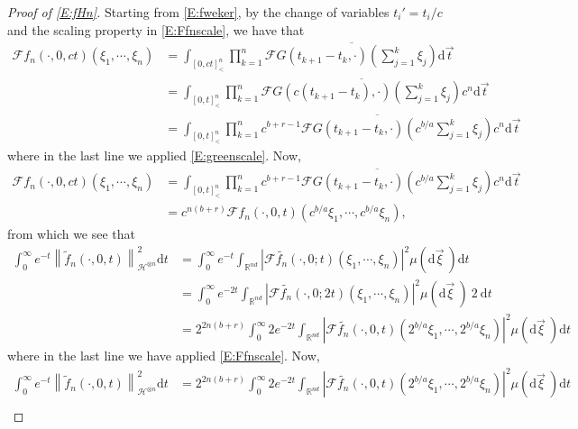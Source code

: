 \documentclass[12pt]{report}
\theoremstyle{plain}
\theoremstyle{definition}
\numberwithin{equation}{section}
\newcommand{\R}{\mathbb{R}}
\newcommand{\Norm}[1]{\left\|  #1   \right\|}
\newcommand{\ud}{\ensuremath{ \mathrm{d} }}
\begin{document}
\begin{proof}[Proof of \eqref{E:fHn}]
	Starting from \eqref{E:fweker}, by the change of variables $t_i' = t_i/c$ and the scaling property
	in \eqref{E:Ffnscale}, we have that
	\begin{align*}
	\mathcal{F}f_n(\cdot,0,ct)(\xi_1,\cdots, \xi_n)
	& = \int_{[0,ct]^n_<} \prod_{k=1}^n \overline{ \mathcal{F}G(t_{k+1} - t_k, \cdot)\left( \sum_{j=1}^k \xi_j \right) }  \ud \vec{t}                   \\
	& = \int_{[0,t]^n_<} \prod_{k=1}^n  \overline{ \mathcal{F}G\left(c(t_{k+1} - t_k), \cdot \right)\left( \sum_{j=1}^k \xi_j \right) } c^n \ud \vec{t} \\
	& = \int_{[0,t]^n_<} \prod_{k=1}^n \overline{ c^{b+r-1} \mathcal{F}G\left(t_{k+1} - t_k, \cdot \right)\left( c^{b/a} \sum_{j=1}^k \xi_j \right) } c^n \ud \vec{t}
	\end{align*}
	where in the last line we applied \eqref{E:greenscale}. Now,
	\begin{align*}
	\mathcal{F}f_n(\cdot,0,ct)(\xi_1,\cdots, \xi_n)
	& = \int_{[0,t]^n_<} \prod_{k=1}^n \overline{ c^{b+r-1} \mathcal{F}G\left(t_{k+1} - t_k, \cdot \right)\left( c^{b/a} \sum_{j=1}^k \xi_j \right) } c^n \ud \vec{t} \\
	& = c^{n(b+r)} \mathcal{F}f_n\left(\cdot,0,t\right)\left(c^{b/a}\xi_1, \cdots, c^{b/a}\xi_n\right),
	\end{align*}
	from which we see that
	\begin{align*}
	\int_0^\infty e^{-t} \Norm{ \widetilde{f}_n(\cdot,0,t) }_{\mathcal{H}^{\otimes n}}^2 \ud t
	& = \int_0^\infty e^{-t} \int_{\R^{nd}} \left| \mathcal{F}\widetilde{f_n}(\cdot,0;t)(\xi_1,\cdots,\xi_n) \right|^2 \mu(\ud \vec{\xi}\:)  \ud t         \\
	& = \int_0^\infty e^{-2t} \int_{\R^{nd}} \left| \mathcal{F}\widetilde{f_n}(\cdot,0;2t)(\xi_1,\cdots,\xi_n) \right|^2 \mu(\ud \vec{\xi}\:) \: 2\: \ud t \\
	& = 2^{2n(b+r)}\int_0^\infty 2e^{-2t} \int_{\R^{nd}} \left| \mathcal{F}\widetilde{f_n}(\cdot,0,t)(2^{b/a}\xi_1,\cdots,2^{b/a}\xi_n) \right|^2 \mu(\ud \vec{\xi}\:)   \ud t
	\end{align*}
	where in the last line we have applied \eqref{E:Ffnscale}. Now,
	\begin{align*}
	\int_0^\infty e^{-t} \Norm{ \widetilde{f}_n(\cdot,0,t) }_{\mathcal{H}^{\otimes n}}^2 \ud t
	& = 2^{2n(b+r)}\int_0^\infty 2e^{-2t} \int_{\R^{nd}} \left| \mathcal{F}\widetilde{f_n}(\cdot,0,t)(2^{b/a}\xi_1,\cdots,2^{b/a}\xi_n) \right|^2 \mu(\ud \vec{\xi}\:) \ud t \\

\end{align*}
\end{proof}
\end{document}
